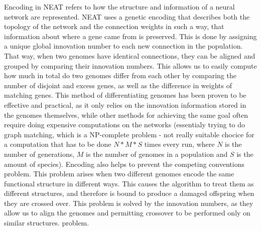 \documentclass{article}
\begin{document}
Encoding in NEAT refers to how the structure and information of a neural network are represented.
NEAT uses a genetic encoding that describes both the topology of the network and the connection weights in such a way, that information about
where a gene came from is preserved. This is done by assigning a unique global innovation number to each new connection in the population.
That way, when two genomes have identical connections, they can be aligned and grouped by comparing their innovation numbers. This allows us 
to easily compute how much in total do two genomes differ from each other by comparing the number of disjoint and excess genes, as well as the 
difference in weights of matching genes. This method of differentiating genomes has been proven to be effective and practical, as it only relies
on the innovation information stored in the genomes themselves, while other methods for achieving the same goal often require
doing expensive computations on the networks (essentialy trying to do graph matching, which is a NP-complete problem - not really suitable chocice
for a computation that has to be done $N*M*S$ times every run, where $N$ is the number of generations, $M$ is the number of genomes in a population
and $S$ is the amount of species).
Encoding also helps to prevent the competing conventions problem. This problem arises when two different genomes encode the same
functional structure in different ways. This causes the algorithm to treat them as different structures, and therefore is bound to produce a 
damaged offspring when they are crossed over. This problem is solved by the innovation numbers, as they allow us to align the genomes and
permitting crossover to be performed only on similar structures.
problem. 
\end{document}
